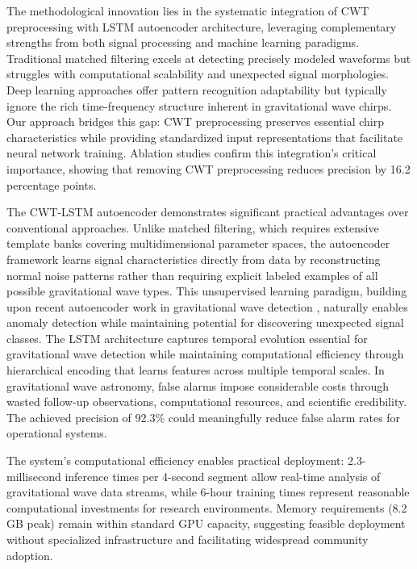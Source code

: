\documentclass{iopjournal}
\begin{document}
The methodological innovation lies in the systematic integration of CWT preprocessing with LSTM autoencoder architecture, leveraging complementary strengths from both signal processing and machine learning paradigms. Traditional matched filtering excels at detecting precisely modeled waveforms but struggles with computational scalability and unexpected signal morphologies. Deep learning approaches offer pattern recognition adaptability but typically ignore the rich time-frequency structure inherent in gravitational wave chirps. Our approach bridges this gap: CWT preprocessing preserves essential chirp characteristics while providing standardized input representations that facilitate neural network training. Ablation studies confirm this integration's critical importance, showing that removing CWT preprocessing reduces precision by 16.2 percentage points.

The CWT-LSTM autoencoder demonstrates significant practical advantages over conventional approaches. Unlike matched filtering, which requires extensive template banks covering multidimensional parameter spaces, the autoencoder framework learns signal characteristics directly from data by reconstructing normal noise patterns rather than requiring explicit labeled examples of all possible gravitational wave types. This unsupervised learning paradigm, building upon recent autoencoder work in gravitational wave detection \cite{torres2024anomaly, lopez2022deep}, naturally enables anomaly detection while maintaining potential for discovering unexpected signal classes. The LSTM architecture captures temporal evolution essential for gravitational wave detection while maintaining computational efficiency through hierarchical encoding that learns features across multiple temporal scales. In gravitational wave astronomy, false alarms impose considerable costs through wasted follow-up observations, computational resources, and scientific credibility. The achieved precision of 92.3\% could meaningfully reduce false alarm rates for operational systems.

The system's computational efficiency enables practical deployment: 2.3-millisecond inference times per 4-second segment allow real-time analysis of gravitational wave data streams, while 6-hour training times represent reasonable computational investments for research environments. Memory requirements (8.2 GB peak) remain within standard GPU capacity, suggesting feasible deployment without specialized infrastructure and facilitating widespread community adoption.
\end{document}
